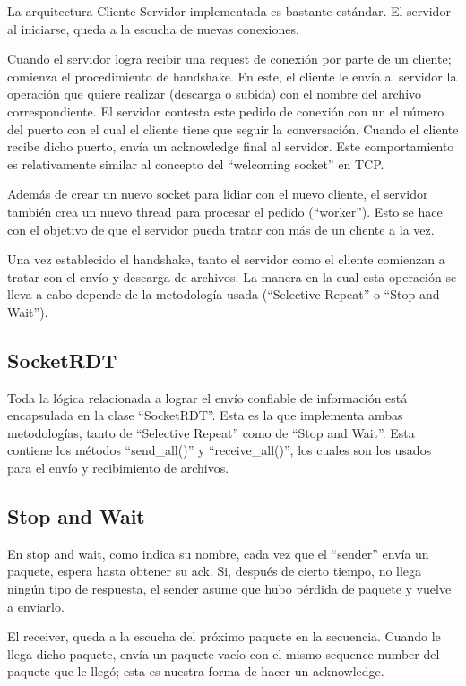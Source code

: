 \documentclass{article}
\begin{document}
La arquitectura Cliente-Servidor implementada es bastante estándar. El
servidor al iniciarse, queda a la escucha de nuevas conexiones.

Cuando el servidor logra recibir una request de conexión por parte de un
cliente; comienza el procedimiento de handshake. En este, el cliente le
envía al servidor la operación que quiere realizar (descarga o subida)
con el nombre del archivo correspondiente. El servidor contesta este
pedido de conexión con un el número del puerto con el cual el cliente
tiene que seguir la conversación. Cuando el cliente recibe dicho puerto,
envía un acknowledge final al servidor. Este comportamiento es
relativamente similar al concepto del ``welcoming socket'' en TCP.

Además de crear un nuevo socket para lidiar con el nuevo cliente, el
servidor también crea un nuevo thread para procesar el pedido
(``worker''). Esto se hace con el objetivo de que el servidor pueda
tratar con más de un cliente a la vez.

Una vez establecido el handshake, tanto el servidor como el cliente
comienzan a tratar con el envío y descarga de archivos. La manera en la
cual esta operación se lleva a cabo depende de la metodología usada
(``Selective Repeat'' o ``Stop and Wait'').

\subsection{SocketRDT}\label{socketrdt}

Toda la lógica relacionada a lograr el envío confiable de información
está encapsulada en la clase ``SocketRDT''. Esta es la que implementa
ambas metodologías, tanto de ``Selective Repeat'' como de ``Stop and
Wait''. Esta contiene los métodos ``send\_all()'' y ``receive\_all()'',
los cuales son los usados para el envío y recibimiento de archivos.

\subsection{Stop and Wait}\label{stop-and-wait}

En stop and wait, como indica su nombre, cada vez que el ``sender''
envía un paquete, espera hasta obtener su ack. Si, después de cierto
tiempo, no llega ningún tipo de respuesta, el sender asume que hubo
pérdida de paquete y vuelve a enviarlo.

El receiver, queda a la escucha del próximo paquete en la secuencia.
Cuando le llega dicho paquete, envía un paquete vacío con el mismo
sequence number del paquete que le llegó; esta es nuestra forma de hacer
un acknowledge.
\end{document}
